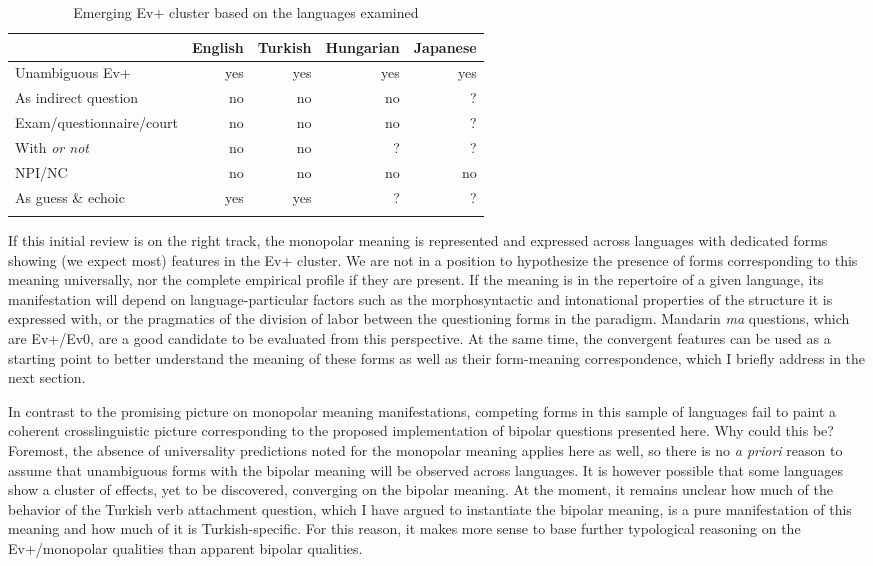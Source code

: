 \documentclass[output=paper,colorlinks,citecolor=brown]{langscibook}
\begin{document}
\begin{table}
\caption{Emerging Ev+ cluster based on the languages examined}
\label{tab2}
 \begin{tabularx}{\textwidth}{X rrrr}
  \lsptoprule
            & English & Turkish  & Hungarian & Japanese\\
  \midrule
Unambiguous Ev+ & yes & yes & yes & yes  \\ %
As indirect question & no & no & no & ?  \\ %
Exam/questionnaire/court & no & no & no & ?   \\ %
With \textit{or not} & no & no & ? & ? \\ %
NPI/NC & no & no & no & no  \\
As guess \& echoic & yes & yes & ? & ?  \\ %
  \lspbottomrule
 \end{tabularx}
\end{table}



If this initial review is on the right track, the monopolar meaning is represented and expressed across languages with dedicated forms showing (we expect most) features in the Ev+ cluster. We are not in a position to hypothesize the presence of forms corresponding to this meaning universally, nor the complete empirical profile if they are present. If the meaning is in the repertoire of a given language, its manifestation will depend on language-particular factors such as the morphosyntactic and intonational properties of the structure it is expressed with, or the pragmatics of the division of labor between the questioning forms in the paradigm. Mandarin \textit{ma} questions, which are Ev+/Ev0, are a good candidate to be evaluated from this perspective. At the same time, the convergent features can be used as a starting point to better understand the meaning of these forms as well as their form-meaning correspondence, which I briefly address in the next section.

In contrast to the promising picture on monopolar meaning manifestations, competing forms in this sample of languages fail to paint a coherent crosslinguistic picture corresponding to the proposed implementation of bipolar questions presented here. Why could this be? Foremost, the absence of universality predictions noted for the monopolar meaning applies here as well, so there is no \textit{a priori} reason to assume that unambiguous forms with the bipolar meaning will be observed across languages. It is however possible that some languages show a cluster of effects, yet to be discovered, converging on the bipolar meaning. At the moment, it remains unclear how much of the behavior of the Turkish verb attachment question, which I have argued to instantiate the bipolar meaning, is a pure manifestation of this meaning and how much of it is Turkish-specific. For this reason, it makes more sense to base further typological reasoning on the Ev+/monopolar qualities than apparent bipolar qualities.
\end{document}
